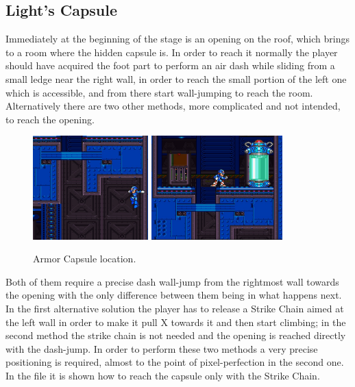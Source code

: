 \subsection{Light's Capsule}\label{X2:Arm_parts}
Immediately at the beginning of the stage is an opening on the roof, which brings to a room where the hidden capsule is. In order to reach it normally the player should have acquired the foot part to perform an air dash while sliding from a small ledge near the right wall, in order to reach the small portion of the left one which is accessible, and from there start wall-jumping to reach the room. Alternatively there are two other methods, more complicated and not intended, to reach the opening.\begin{figure}[htp]
	\centering
	\includegraphics[height=4cm]{figures/X2/Wheel_gator/Gator_capsule_1.jpg}
	\includegraphics[height=4cm]{figures/X2/Wheel_gator/Gator_capsule_2.jpg}
	\caption{Armor Capsule location.}
\end{figure}
 Both of them require a precise dash wall-jump from the rightmost wall towards the opening with the only difference between them being in what happens next. In the first alternative solution the player has to release a Strike Chain aimed at the left wall in order to make it pull X towards it and then start climbing; in the second method the strike chain is not needed and the opening is reached directly with the dash-jump. In order to perform these two methods a very precise positioning is required, almost to the point of pixel-perfection in the second one. In the file  it is shown how to reach the capsule only with the Strike Chain.

